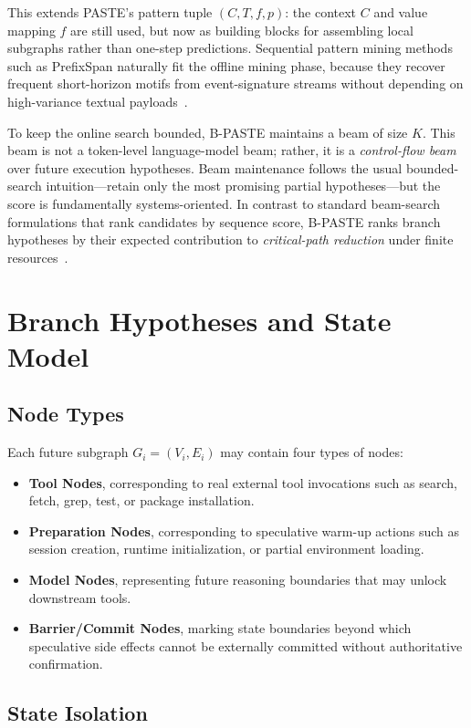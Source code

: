 \documentclass[10pt,twocolumn]{article}
\begin{document}
This extends PASTE's pattern tuple $(C,T,f,p)$: the context $C$ and value mapping $f$ are still used, but now as building blocks for assembling local subgraphs rather than one-step predictions. Sequential pattern mining methods such as PrefixSpan naturally fit the offline mining phase, because they recover frequent short-horizon motifs from event-signature streams without depending on high-variance textual payloads~\cite{prefixspan}.

To keep the online search bounded, B-PASTE maintains a beam of size $K$. This beam is not a token-level language-model beam; rather, it is a \emph{control-flow beam} over future execution hypotheses. Beam maintenance follows the usual bounded-search intuition---retain only the most promising partial hypotheses---but the score is fundamentally systems-oriented. In contrast to standard beam-search formulations that rank candidates by sequence score, B-PASTE ranks branch hypotheses by their expected contribution to \emph{critical-path reduction} under finite resources~\cite{beamsearch}.

\section{Branch Hypotheses and State Model}

\subsection{Node Types}

Each future subgraph $G_i=(V_i,E_i)$ may contain four types of nodes:
\begin{itemize}[leftmargin=1.5em]
    \item \textbf{Tool Nodes}, corresponding to real external tool invocations such as search, fetch, grep, test, or package installation.
    \item \textbf{Preparation Nodes}, corresponding to speculative warm-up actions such as session creation, runtime initialization, or partial environment loading.
    \item \textbf{Model Nodes}, representing future reasoning boundaries that may unlock downstream tools.
    \item \textbf{Barrier/Commit Nodes}, marking state boundaries beyond which speculative side effects cannot be externally committed without authoritative confirmation.
\end{itemize}

\subsection{State Isolation}
\end{document}
